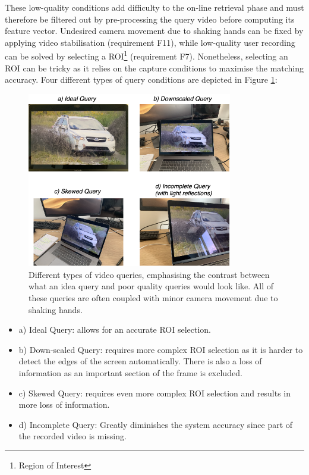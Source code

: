 These low-quality conditions add difficulty to the on-line retrieval phase and must therefore be filtered out by pre-processing the query video before computing its feature vector. Undesired camera movement due to shaking hands can be fixed by applying video stabilisation (requirement F11), while low-quality user recording can be solved by selecting a ROI\footnote{Region of Interest} (requirement F7). Nonetheless, selecting an ROI can be tricky as it relies on the capture conditions to maximise the matching accuracy. Four different types of query conditions are depicted in Figure \ref{fig:difference-query-video-issues}:

\begin{figure}[h]
\centerline{\includegraphics[width=0.8\textwidth]{figures/design/difference-query-video-issues.png}}
\caption{\label{fig:difference-query-video-issues}Different types of video queries, emphasising the contrast between what an idea query and poor quality queries would look like. All of these queries are often coupled with minor camera movement due to shaking hands.}
\end{figure}

\begin{itemize}
    \item a) Ideal Query: allows for an accurate ROI selection.
    \item b) Down-scaled Query: requires more complex ROI selection as it is harder to detect the edges of the screen automatically. There is also a loss of information as an important section of the frame is excluded.
    \item c) Skewed Query: requires even more complex ROI selection and results in more loss of information.
    \item d) Incomplete Query: Greatly diminishes the system accuracy since part of the recorded video is missing.
\end{itemize}

